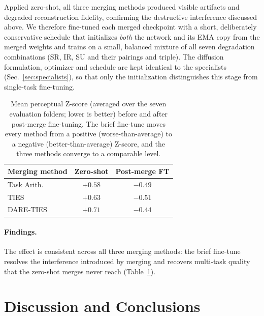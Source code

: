 \documentclass{article}
\begin{document}
Applied zero-shot, all three merging methods produced visible artifacts and degraded reconstruction fidelity, confirming the destructive interference discussed above. We therefore fine-tuned each merged checkpoint with a short, deliberately conservative schedule that initializes \emph{both} the network and its EMA copy from the merged weights and trains on a small, balanced mixture of all seven degradation combinations (SR, IR, SU and their pairings and triple). The diffusion formulation, optimizer and schedule are kept identical to the specialists (Sec.~\ref{sec:specialists}), so that only the initialization distinguishes this stage from single-task fine-tuning.

\begin{table}[t]
	\begin{center}
		\begin{small}
			\begin{tabular}{lcc}
				\toprule
				Merging method & Zero-shot & Post-merge FT \\
				\midrule
				Task Arith.\   & $+0.58$   & $-0.49$       \\
				TIES           & $+0.63$   & $-0.51$       \\
				DARE-TIES      & $+0.71$   & $-0.44$       \\
				\bottomrule
			\end{tabular}
		\end{small}
	\end{center}
	\caption{Mean perceptual Z-score (averaged over the seven evaluation folders; lower is better) before and after post-merge fine-tuning. The brief fine-tune moves every method from a positive (worse-than-average) to a negative (better-than-average) Z-score, and the three methods converge to a comparable level.}
	\label{tab:zscore_ft}
\end{table}

\paragraph*{Findings.} The effect is consistent across all three merging methods: the brief fine-tune resolves the interference introduced by merging and recovers multi-task quality that the zero-shot merges never reach (Table~\ref{tab:zscore_ft}).

\section{Discussion and Conclusions}
\label{sec:discussion}
\end{document}

